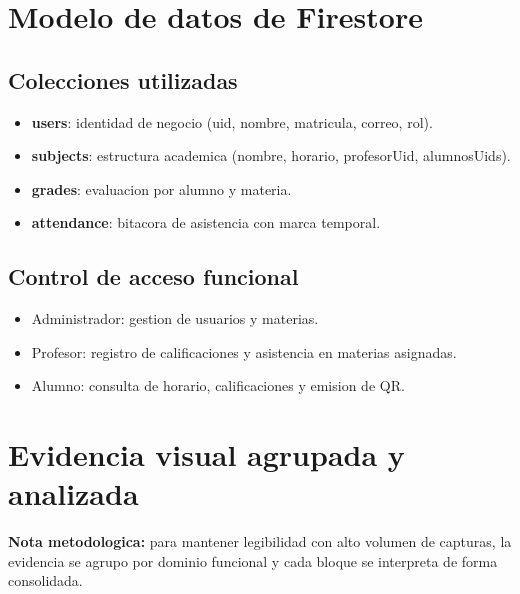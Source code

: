 \documentclass[12pt,a4paper]{article}
\begin{document}
\section{Modelo de datos de Firestore}
\subsection*{Colecciones utilizadas}
\begin{itemize}[leftmargin=*]
    \item \textbf{users}: identidad de negocio (uid, nombre, matricula, correo, rol).
    \item \textbf{subjects}: estructura academica (nombre, horario, profesorUid, alumnosUids).
    \item \textbf{grades}: evaluacion por alumno y materia.
    \item \textbf{attendance}: bitacora de asistencia con marca temporal.
\end{itemize}

\subsection*{Control de acceso funcional}
\begin{itemize}[leftmargin=*]
    \item Administrador: gestion de usuarios y materias.
    \item Profesor: registro de calificaciones y asistencia en materias asignadas.
    \item Alumno: consulta de horario, calificaciones y emision de QR.
\end{itemize}

\section{Evidencia visual agrupada y analizada}
\textbf{Nota metodologica:} para mantener legibilidad con alto volumen de capturas, la evidencia se agrupo por dominio funcional y cada bloque se interpreta de forma consolidada.
\end{document}
